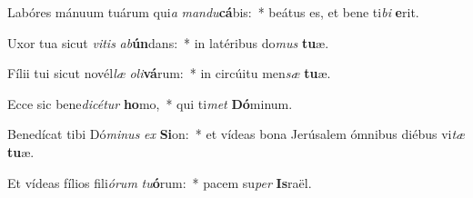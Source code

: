 \item Labóres mánuum tuárum qui\textit{a} \textit{man}\textit{du}\textbf{cá}bis:~* beátus es, et bene ti\textit{bi} \textbf{e}rit.
\item Uxor tua sicut \textit{vi}\textit{tis} \textit{ab}\textbf{ún}dans:~* in latéribus do\textit{mus} \textbf{tu}æ.
\item Fílii tui sicut novél\textit{læ} \textit{o}\textit{li}\textbf{vá}rum:~* in circúitu men\textit{sæ} \textbf{tu}æ.
\item Ecce sic bene\textit{di}\textit{cé}\textit{tur} \textbf{ho}mo,~* qui ti\textit{met} \textbf{Dó}minum.
\item Benedícat tibi Dó\textit{mi}\textit{nus} \textit{ex} \textbf{Si}on:~* et vídeas bona Jerúsalem ómnibus diébus vi\textit{tæ} \textbf{tu}æ.
\item Et vídeas fílios fili\textit{ó}\textit{rum} \textit{tu}\textbf{ó}rum:~* pacem su\textit{per} \textbf{Is}raël.
